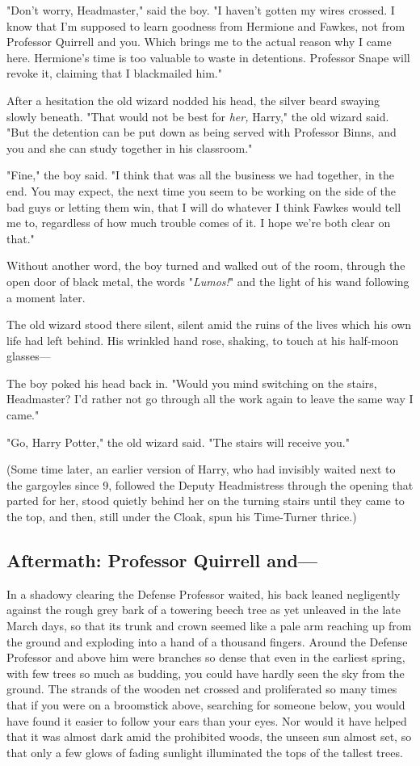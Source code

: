 "Don't worry, Headmaster," said the boy. "I haven't gotten my wires crossed. I 
know that I'm supposed to learn goodness from Hermione and Fawkes, not from 
Professor Quirrell and you. Which brings me to the actual reason why I came 
here. Hermione's time is too valuable to waste in detentions. Professor Snape 
will revoke it, claiming that I blackmailed him."

After a hesitation the old wizard nodded his head, the silver beard swaying 
slowly beneath. "That would not be best for \emph{her,} Harry," the old wizard 
said. "But the detention can be put down as being served with Professor Binns, 
and you and she can study together in his classroom."

"Fine," the boy said. "I think that was all the business we had together, in 
the end. You may expect, the next time you seem to be working on the side of 
the bad guys or letting them win, that I will do whatever I think Fawkes would 
tell me to, regardless of how much trouble comes of it. I hope we're both clear 
on that."

Without another word, the boy turned and walked out of the room, through the 
open door of black metal, the words "\emph{Lumos!}" and the light of his wand 
following a moment later.

The old wizard stood there silent, silent amid the ruins of the lives which his 
own life had left behind. His wrinkled hand rose, shaking, to touch at his 
half-moon glasses---

The boy poked his head back in. "Would you mind switching on the stairs, 
Headmaster? I'd rather not go through all the work again to leave the same way 
I came."

"Go, Harry Potter," the old wizard said. "The stairs will receive you."

(Some time later, an earlier version of Harry, who had invisibly waited next to 
the gargoyles since 9\PM, followed the Deputy Headmistress through the opening 
that parted for her, stood quietly behind her on the turning stairs until they 
came to the top, and then, still under the Cloak, spun his Time-Turner thrice.)
\sbreak
\subsection{Aftermath: Professor Quirrell and---}

In a shadowy clearing the Defense Professor waited, his back leaned negligently 
against the rough grey bark of a towering beech tree as yet unleaved in the 
late March days, so that its trunk and crown seemed like a pale arm reaching up 
from the ground and exploding into a hand of a thousand fingers. Around the 
Defense Professor and above him were branches so dense that even in the 
earliest spring, with few trees so much as budding, you could have hardly seen 
the sky from the ground. The strands of the wooden net crossed and proliferated 
so many times that if you were on a broomstick above, searching for someone 
below, you would have found it easier to follow your ears than your eyes. Nor 
would it have helped that it was almost dark amid the prohibited woods, the 
unseen sun almost set, so that only a few glows of fading sunlight illuminated 
the tops of the tallest trees.

